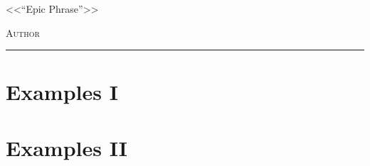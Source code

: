 \documentclass[12pt,a4paper]{book}
\begin{document}
\renewcommand{\contentsname}{\vspace{0cm} Contenido \vspace{-2cm}}

\begin{titlepage}
\vspace*{2cm}

\noindent
\vspace*{0.5cm}

\vspace{1.5cm}
\epigraph{<<``Epic Phrase''>>}%
{ \textsc{Author}}
\null\vfill
\vspace*{1cm}
\noindent
\hfill
\begin{minipage}{0.7\linewidth}
    \begin{flushright}
        \printauthor %
    \end{flushright}
\end{minipage}
%
\begin{minipage}{0.02\linewidth}
    \rule{1pt}{70pt}
\end{minipage}
\titlepagedecoration
\end{titlepage}

\let\cleardoublepage=\clearpage
\tableofcontents
\blankpage

\chapter{Examples I}

\newpage\thispagestyle{empty}\blankpage
\chapter{Examples II}



\blankpage


\nocite{*}
\end{document}

